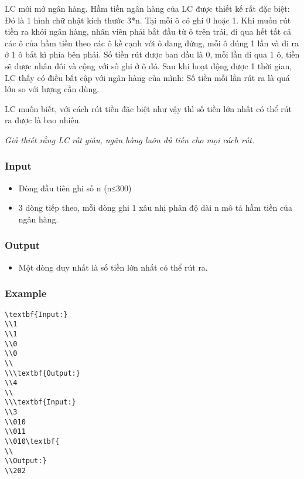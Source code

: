 



   LC mới mở ngân hàng. Hầm tiền ngân hàng của LC được thiết kế rất đặc biệt: Đó là 1 hình chữ nhật kích thước 3*n. Tại mỗi ô có ghi 0 hoặc 1. Khi muốn rút tiền ra khỏi ngân hàng, nhân viên phải bắt đầu từ ô trên trái, đi qua hết tất cả các ô của hầm tiền theo các ô kề cạnh với ô đang đứng, mỗi ô đúng 1 lần và đi ra ở 1 ô bất kì phía bên phải. Số tiền rút được ban đầu là 0, mỗi lần đi qua 1 ô, tiền sẽ được nhân đôi và cộng với số ghi ở ô đó. Sau khi hoạt động được 1 thời gian, LC thấy có điều bất cập với ngân hàng của mình: Số tiền mỗi lần rút ra là quá lớn so với lượng cần dùng.  

   LC muốn biết, với cách rút tiền đặc biệt như vậy thì số tiền lớn nhất có thể rút ra được là bao nhiêu.  

\emph{    Giả thiết rằng LC rất giàu, ngân hàng luôn đủ tiền cho mọi cách rút.   }

\subsubsection{   Input  }
\begin{itemize}
	\item     Dòng đầu tiên ghi số n (n≤300)   
	\item     3 dòng tiếp theo, mỗi dòng ghi 1 xâu nhị phân độ dài n mô tả hầm tiền của ngân hàng.   
\end{itemize}

\subsubsection{   Output  }
\begin{itemize}
	\item     Một dòng duy nhất là số tiền lớn nhất có thể rút ra.   
\end{itemize}

\subsubsection{   Example  }
\begin{verbatim}
\textbf{Input:}
\\1
\\1
\\0
\\0
\\
\\\textbf{Output:}
\\4
\\
\\\textbf{Input:}
\\3
\\010
\\011
\\010\textbf{
\\
\\Output:}
\\202\end{verbatim}